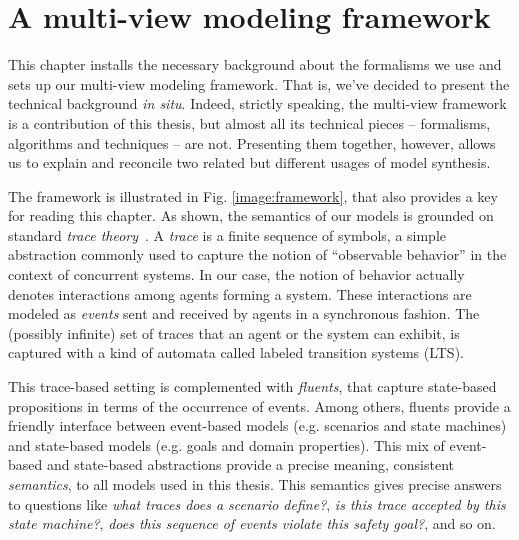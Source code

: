 \chapter{A multi-view modeling framework\label{chapter:framework}}

This chapter installs the necessary background about the formalisms we use and sets up our multi-view modeling framework. That is, we've decided to present the technical background \emph{in situ}. Indeed, strictly speaking, the multi-view framework is a contribution of this thesis, but almost all its technical pieces -- formalisms, algorithms and techniques -- are not. Presenting them together, however, allows us to explain and reconcile two related but different usages of model synthesis.

The framework is illustrated in Fig. \ref{image:framework}, that also provides a key for reading this chapter. As shown, the semantics of our models is grounded on standard \emph{trace theory}~\cite{Hoare:1985}. A \emph{trace} is a finite sequence of symbols, a simple abstraction commonly used to capture the notion of ``observable behavior'' in the context of concurrent systems. In our case, the notion of behavior actually denotes interactions among agents forming a system. These interactions are modeled as \emph{events} sent and received by agents in a synchronous fashion. The (possibly infinite) set of traces that an agent or the system can exhibit, is captured with a kind of automata called labeled transition systems (LTS).

This trace-based setting is complemented with \emph{fluents}, that capture state-based propositions in terms of the occurrence of events. Among others, fluents provide a friendly interface between event-based models (e.g. scenarios and state machines) and state-based models (e.g. goals and domain properties). This mix of event-based and state-based abstractions provide a precise meaning, consistent \emph{semantics}, to all models used in this thesis. This semantics gives precise answers to questions like \emph{what traces does a scenario define?}, \emph{is this trace accepted by this state machine?}, \emph{does this sequence of events violate this safety goal?}, and so on.

